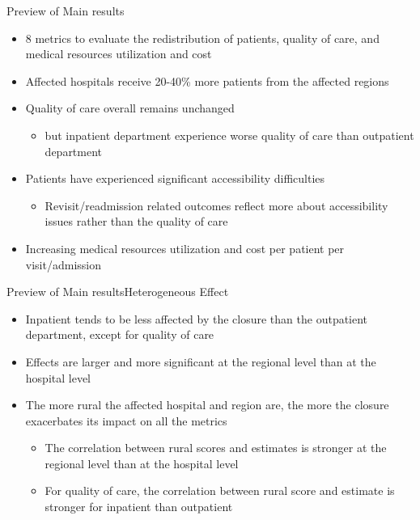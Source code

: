 \documentclass{beamer}
\theoremstyle{definition}
\begin{document}
\begin{frame}{Preview of Main results}

\begin{itemize}
\setlength{\itemsep}{17pt}
    \item 8 metrics to evaluate the redistribution of patients, quality of care, and medical resources utilization and cost
    \item Affected hospitals receive 20-40\% more patients from the affected regions 
    \item Quality of care overall remains unchanged
    \begin{itemize}
    \setlength{\itemsep}{6pt}
        \item but inpatient department experience worse quality of care than outpatient department 
    \end{itemize}
    \item Patients have experienced significant accessibility difficulties
    \begin{itemize}
    \setlength{\itemsep}{6pt}
        \item Revisit/readmission related outcomes reflect more about accessibility issues rather than the quality of care %
    \end{itemize}
    \item Increasing medical resources utilization and cost per patient per visit/admission

    
\end{itemize}


\end{frame}


\begin{frame}{Preview of Main results}{Heterogeneous Effect}

\begin{itemize}
\setlength{\itemsep}{17pt}
    \item Inpatient tends to be less affected by the closure than the outpatient department, except for quality of care
    \item Effects are larger and more significant at the regional level than at the hospital level
    \item The more rural the affected hospital and region are, the more the closure exacerbates its impact on all the metrics 
    \begin{itemize}
    \setlength{\itemsep}{10pt} %
        \item The correlation between rural scores and estimates is stronger at the regional level than at the hospital level
        \item For quality of care, the correlation between rural score and estimate is stronger for inpatient than outpatient
    \end{itemize}
\end{itemize}
    
\end{frame}
\end{document}
